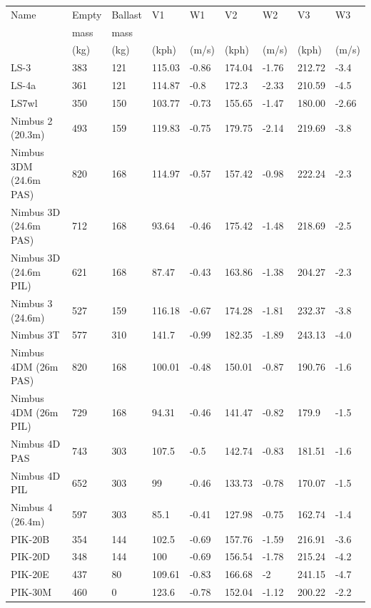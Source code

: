 \documentclass[a4paper,12pt]{refrep}
\begin{document}
\begin{maxipage}
\begin{small}
\begin{longtable}{l l l l l l l l l}
\toprule
Name & Empty & Ballast & V1 & W1 & V2 & W2 & V3 & W3 \\
     & mass       & mass         &  &  &  &  &  &  \\
     & (kg)       & (kg)         & (kph) & (m/s) & (kph) & (m/s) & (kph) & (m/s) \\
\midrule
LS-3 & 383 & 121 & 115.03 & -0.86 & 174.04 & -1.76 & 212.72 & -3.4 \\
LS-4a & 361 & 121 & 114.87 & -0.8 & 172.3 & -2.33 & 210.59 & -4.5 \\
LS7wl & 350 & 150 & 103.77 & -0.73 & 155.65 & -1.47 & 180.00 & -2.66 \\
Nimbus 2 (20.3m) & 493 & 159 & 119.83 & -0.75 & 179.75 & -2.14 & 219.69 & -3.8 \\
Nimbus 3DM (24.6m PAS) & 820 & 168 & 114.97 & -0.57 & 157.42 & -0.98 & 222.24 & -2.3 \\
Nimbus 3D (24.6m PAS) & 712 & 168 & 93.64 & -0.46 & 175.42 & -1.48 & 218.69 & -2.5 \\
Nimbus 3D (24.6m PIL) & 621 & 168 & 87.47 & -0.43 & 163.86 & -1.38 & 204.27 & -2.3 \\
Nimbus 3 (24.6m) & 527 & 159 & 116.18 & -0.67 & 174.28 & -1.81 & 232.37 & -3.8 \\
Nimbus 3T & 577 & 310 & 141.7 & -0.99 & 182.35 & -1.89 & 243.13 & -4.0 \\
Nimbus 4DM (26m PAS) & 820 & 168 & 100.01 & -0.48 & 150.01 & -0.87 & 190.76 & -1.6 \\
Nimbus 4DM (26m PIL) & 729 & 168 & 94.31 & -0.46 & 141.47 & -0.82 & 179.9 & -1.5 \\
Nimbus 4D PAS & 743 & 303 & 107.5 & -0.5 & 142.74 & -0.83 & 181.51 & -1.6 \\
Nimbus 4D PIL & 652 & 303 & 99 & -0.46 & 133.73 & -0.78 & 170.07 & -1.5 \\
Nimbus 4 (26.4m) & 597 & 303 & 85.1 & -0.41 & 127.98 & -0.75 & 162.74 & -1.4 \\
PIK-20B & 354 & 144 & 102.5 & -0.69 & 157.76 & -1.59 & 216.91 & -3.6 \\
PIK-20D & 348 & 144 & 100 & -0.69 & 156.54 & -1.78 & 215.24 & -4.2 \\
PIK-20E & 437 & 80 & 109.61 & -0.83 & 166.68 & -2 & 241.15 & -4.7 \\
PIK-30M & 460 & 0 & 123.6 & -0.78 & 152.04 & -1.12 & 200.22 & -2.2 \\

\end{longtable}
\end{small}
\end{maxipage}
\end{document}

